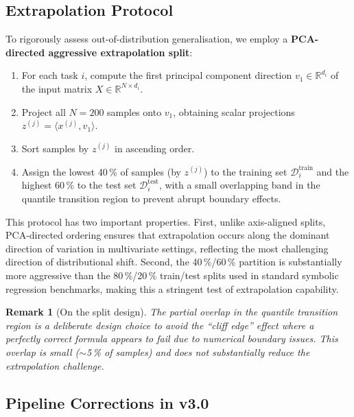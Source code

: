 \documentclass[twoside,11pt]{article}
\newtheorem{remark}[theorem]{Remark}
\begin{document}
\subsection{Extrapolation Protocol}
\label{sec:split}

To rigorously assess out-of-distribution generalisation, we employ a
\textbf{PCA-directed aggressive extrapolation split}:

\begin{enumerate}[leftmargin=2em,label=\arabic*.]
  \item For each task $i$, compute the first principal component direction
    $v_1 \in \mathbb{R}^{d_i}$ of the input matrix $X \in \mathbb{R}^{N \times d_i}$.
  \item Project all $N=200$ samples onto $v_1$, obtaining scalar projections
    $z^{(j)} = \langle x^{(j)}, v_1 \rangle$.
  \item Sort samples by $z^{(j)}$ in ascending order.
  \item Assign the lowest 40\,\% of samples (by $z^{(j)}$) to the training set
    $\mathcal{D}^{\mathrm{train}}_i$ and the highest 60\,\% to the test set
    $\mathcal{D}^{\mathrm{test}}_i$, with a small overlapping band in the
    quantile transition region to prevent abrupt boundary effects.
\end{enumerate}

This protocol has two important properties.  First, unlike axis-aligned splits,
PCA-directed ordering ensures that extrapolation occurs along the dominant
direction of variation in multivariate settings, reflecting the most
challenging direction of distributional shift.  Second, the 40\,\%/60\,\%
partition is substantially more aggressive than the 80\,\%/20\,\% train/test
splits used in standard symbolic regression benchmarks, making this a stringent
test of extrapolation capability.

\begin{remark}[On the split design]
The partial overlap in the quantile transition region is a deliberate design choice
to avoid the ``cliff edge'' effect where a perfectly correct formula appears to
fail due to numerical boundary issues.  This overlap is small ($\sim$5\,\% of
samples) and does not substantially reduce the extrapolation challenge.
\end{remark}

\subsection{Pipeline Corrections in v3.0}
\label{sec:r2_bugfix}
\label{sec:corrections}
\end{document}
